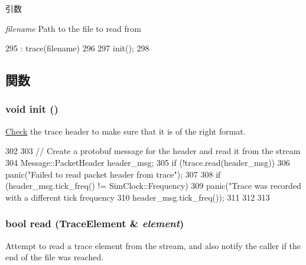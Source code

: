 \begin{DoxyParams}{引数}
\item[{\em filename}]Path to the file to read from \end{DoxyParams}



\begin{DoxyCode}
295     : trace(filename)
296 {
297     init();
298 }
\end{DoxyCode}


\subsection{関数}
\hypertarget{classTraceGen_1_1InputStream_a02fd73d861ef2e4aabb38c0c9ff82947}{
\subsubsection[{init}]{\setlength{\rightskip}{0pt plus 5cm}void init ()}}
\label{classTraceGen_1_1InputStream_a02fd73d861ef2e4aabb38c0c9ff82947}
\hyperlink{classCheck}{Check} the trace header to make sure that it is of the right format. 


\begin{DoxyCode}
302 {
303     // Create a protobuf message for the header and read it from the stream
304     Message::PacketHeader header_msg;
305     if (!trace.read(header_msg)) {
306         panic("Failed to read packet header from trace\n");
307 
308         if (header_msg.tick_freq() != SimClock::Frequency) {
309             panic("Trace was recorded with a different tick frequency %
310                   header_msg.tick_freq());
311         }
312     }
313 }
\end{DoxyCode}
\hypertarget{classTraceGen_1_1InputStream_ad46fc07f6483a6b8cd3b07223de00477}{
\subsubsection[{read}]{\setlength{\rightskip}{0pt plus 5cm}bool read ({\bf TraceElement} \& {\em element})}}
\label{classTraceGen_1_1InputStream_ad46fc07f6483a6b8cd3b07223de00477}
Attempt to read a trace element from the stream, and also notify the caller if the end of the file was reached.


